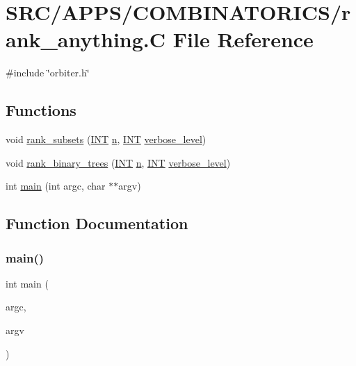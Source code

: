 \hypertarget{rank__anything_8_c}{}\section{S\+R\+C/\+A\+P\+P\+S/\+C\+O\+M\+B\+I\+N\+A\+T\+O\+R\+I\+C\+S/rank\+\_\+anything.C File Reference}
\label{rank__anything_8_c}
{\ttfamily \#include \char`\"{}orbiter.\+h\char`\"{}}\newline
\subsection*{Functions}
\begin{DoxyCompactItemize}
\item 
void \mbox{\hyperlink{rank__anything_8_c_a86230af3031e0c6e6075674d14788942}{rank\+\_\+subsets}} (\mbox{\hyperlink{galois_8h_a09fddde158a3a20bd2dcadb609de11dc}{I\+NT}} \mbox{\hyperlink{simeon_8_c_a7f2cd26777ce0ff3fdaf8d02aacbddfb}{n}}, \mbox{\hyperlink{galois_8h_a09fddde158a3a20bd2dcadb609de11dc}{I\+NT}} \mbox{\hyperlink{simeon_8_c_a818073fbcc2f439e7c56952f67386122}{verbose\+\_\+level}})
\item 
void \mbox{\hyperlink{rank__anything_8_c_a80b566d83b03cf874471b0a4d26626e2}{rank\+\_\+binary\+\_\+trees}} (\mbox{\hyperlink{galois_8h_a09fddde158a3a20bd2dcadb609de11dc}{I\+NT}} \mbox{\hyperlink{simeon_8_c_a7f2cd26777ce0ff3fdaf8d02aacbddfb}{n}}, \mbox{\hyperlink{galois_8h_a09fddde158a3a20bd2dcadb609de11dc}{I\+NT}} \mbox{\hyperlink{simeon_8_c_a818073fbcc2f439e7c56952f67386122}{verbose\+\_\+level}})
\item 
int \mbox{\hyperlink{rank__anything_8_c_a3c04138a5bfe5d72780bb7e82a18e627}{main}} (int argc, char $\ast$$\ast$argv)
\end{DoxyCompactItemize}


\subsection{Function Documentation}
\mbox{\label{rank__anything_8_c_a3c04138a5bfe5d72780bb7e82a18e627}} 
\subsubsection{\texorpdfstring{main()}{main()}}
{\footnotesize\ttfamily int main (\begin{DoxyParamCaption}\item[{int}]{argc,  }\item[{char $\ast$$\ast$}]{argv }\end{DoxyParamCaption})}

